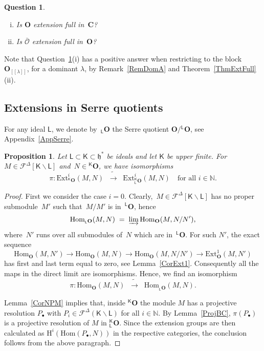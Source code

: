 \documentclass[11pt]{amsart}
\newcommand{\lbra}{[\![}
\newcommand{\rbra}{]\!]}
\newcommand{\LLL}{\mathsf{L}}
\newcommand{\KKK}{\mathsf{K}}
\newcommand{\cF}{{\mathcal{F}}}
\newcommand{\cO}{\mathcal O}
\newcommand{\bO}{\mathbf{O}}
\newcommand{\bC}{\mathbf{C}}
\newcommand{\Hom}{\mathrm{Hom}}
\newcommand{\Ext}{\mathrm{Ext}}
\newcommand{\fh}{\mathfrak{h}}
\newcommand{\mN}{\mathbb{N}}
\numberwithin{equation}{section}
\theoremstyle{plain}
\newtheorem{prop}[subsubsection]{Proposition}
\newtheorem{que}[subsubsection]{Question}
\theoremstyle{remark}
\theoremstyle{remark}
\theoremstyle{construction}
\begin{document}
\begin{que}\label{QueExtFull}
\begin{enumerate}[(i)]
\item Is $\bO$ extension full in~$\bC$?
\item Is $\bar{\cO}$ extension full in~$\bO$?
\end{enumerate}
\end{que}
Note that Question~\ref{QueExtFull}(i) has a positive answer when restricting to the block $\bO_{\lbra\lambda\rbra}$, for a dominant $\lambda$, by Remark~\ref{RemDomA} and Theorem~\ref{ThmExtFull}(ii).




\subsection{Extensions in Serre quotients}For any ideal $\LLL$, we denote {by~${}_{\LLL}\bO$} the Serre quotient $\bO/{}^{\LLL}\bO$, see Appendix~\ref{AppSerre}. %
\begin{prop}\label{PropExtpi}
Let $\LLL\subset\KKK\subset\fh^\ast$ be ideals and let $\KKK$ be upper finite. For $M\in\cF^{\Delta}[\KKK\backslash \LLL]$ and~$N\in{}^{\KKK}\bO$, we have isomorphisms
$$\pi:\Ext^i_{{}^{\KKK}\bO}(M,N)\;\;\tilde\to\;\; \Ext^i_{{}_{\LLL}^{\KKK}\bO}(M,N)\quad\mbox{for all $i\in\mN$.}$$
\end{prop}
\begin{proof}
First we consider the case $i=0$. Clearly{,}~$M\in\cF^{\Delta}[\KKK\backslash \LLL]$ has no proper submodule~$M'$ such that~$M/M'$ is in~${}^{\LLL}\bO$, hence
$$\Hom_{{}_{\LLL}\bO}( M,N)\;=\;\varinjlim \Hom_{\bO}(M,N/N'),$$
where~$N'$ runs over all submodules of~$N$ which are in~${}^{\LLL}\bO$.
For such $N'$, the exact sequence
$$\Hom_{\bO}(M,N')\to \Hom_{\bO}(M,N)\to\Hom_{\bO}(M,N/N')\to \Ext^1_{\bO}(M,N')$$
has first and last term equal to zero, see Lemma~\ref{CorExt1}. Consequently
all the maps in the direct limit are isomorphisms. Hence, we find an isomorphism
$$\pi:\Hom_{\bO}(M,N)\;\;\tilde\to\;\; \Hom_{{}_{\LLL}\bO}(M,N).$$



Lemma~\ref{CorNPM} implies that, inside ${}^{\KKK}\bO$ the module $M$ has a projective resolution $P_\bullet$ with $P_i\in\cF^{\Delta}(\KKK\backslash\LLL)$ for all $i\in\mN$. By Lemma~\ref{ProjBC}, $\pi(P_\bullet)$ is a projective resolution of $M$ in ${}^{\KKK}_{\LLL}\bO$. Since the extension groups are then calculated as ${\mathrm H}^i(\Hom(P_\bullet,N))$ in the respective categories, the conclusion follows from the above paragraph.
\end{proof}
 
\end{document}
